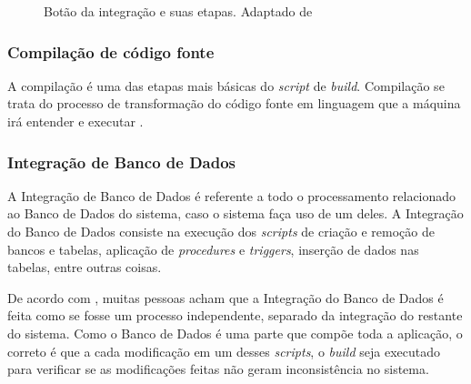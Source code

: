 \begin{figure}[ht]
    \centering
    \caption{Botão da integração e suas etapas. Adaptado de \cite{DUVALL}}
    \label{botao_integracao}
\end{figure}

\subsubsection{Compilação de código fonte}

A compilação é uma das etapas mais básicas do \textit{script} de \textit{build}. Compilação se trata do processo de transformação do código fonte em linguagem que a máquina irá entender e executar \cite{DUVALL}.

\subsubsection{Integração de Banco de Dados}

A Integração de Banco de Dados é referente a todo o processamento relacionado ao Banco de Dados do sistema, caso o sistema faça uso de um deles. A Integração do Banco de Dados consiste na execução dos \textit{scripts} de criação e remoção de bancos e tabelas, aplicação de \textit{procedures} e \textit{triggers}, inserção de dados nas tabelas, entre outras coisas.

De acordo com , muitas pessoas acham que a Integração do Banco de Dados é feita como se fosse um processo independente, separado da integração do restante do sistema. Como o Banco de Dados é uma parte que compõe toda a aplicação, o correto é que a cada modificação em um desses \textit{scripts}, o \textit{build} seja executado para verificar se as modificações feitas não geram inconsistência no sistema.

